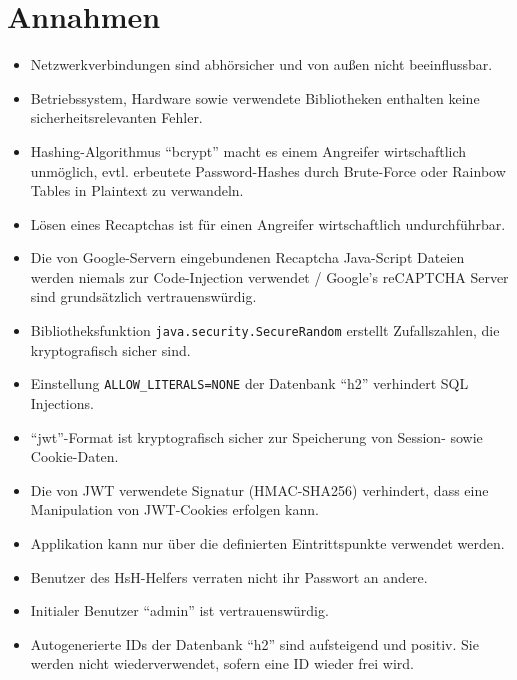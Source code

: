 \documentclass[fontsize=12pt,DIV=14,BCOR=10mm,a4paper,parskip=half-,english,ngerman,bibliography=totocnumbered]{scrreprt}
\begin{document}
\vspace*{-3cm}

\addto{\captionsgerman}{\renewcommand{\refname}{Literaturverzeichnis}}

\clearpage

\tableofcontents  %

\clearpage

\chapter{Annahmen}

\begin{itemize}
  \item Netzwerkverbindungen sind abhörsicher und von außen nicht beeinflussbar.
  \item Betriebssystem, Hardware sowie verwendete Bibliotheken enthalten keine sicherheitsrelevanten Fehler.
  \item Hashing-Algorithmus \enquote{bcrypt} macht es einem Angreifer wirtschaftlich unmöglich, evtl. erbeutete Password-Hashes durch Brute-Force oder Rainbow Tables in Plaintext zu verwandeln.
  \item Lösen eines Recaptchas ist für einen Angreifer wirtschaftlich undurchführbar.
  \item Die von Google-Servern eingebundenen Recaptcha Java-Script Dateien werden niemals zur Code-Injection verwendet / Google's reCAPTCHA Server sind grund\-sätzlich vertrauenswürdig.
  \item Bibliotheksfunktion \texttt{java.security.SecureRandom} \autocite{JavaDocs.SecureRandom} erstellt Zufallszahlen, die kryptografisch sicher sind.
  \item Einstellung \texttt{ALLOW\_LITERALS=NONE} der Datenbank \enquote{h2} verhindert SQL Injections.
  \item \enquote{\gls{jwt}}-Format ist kryptografisch sicher zur Speicherung von Session- sowie Cookie-Daten.
  \item Die von JWT verwendete Signatur (HMAC-SHA256) verhindert, dass eine Manipulation von JWT-Cookies erfolgen kann.
  \item Applikation kann nur über die definierten Eintrittspunkte verwendet werden.
  \item Benutzer des HsH-Helfers verraten nicht ihr Passwort an andere.
  \item Initialer Benutzer \enquote{admin} ist vertrauenswürdig.
  \item Autogenerierte IDs der Datenbank \enquote{h2} sind aufsteigend und positiv. Sie werden nicht wiederverwendet, sofern eine ID wieder frei wird.

\end{itemize}
\end{document}
